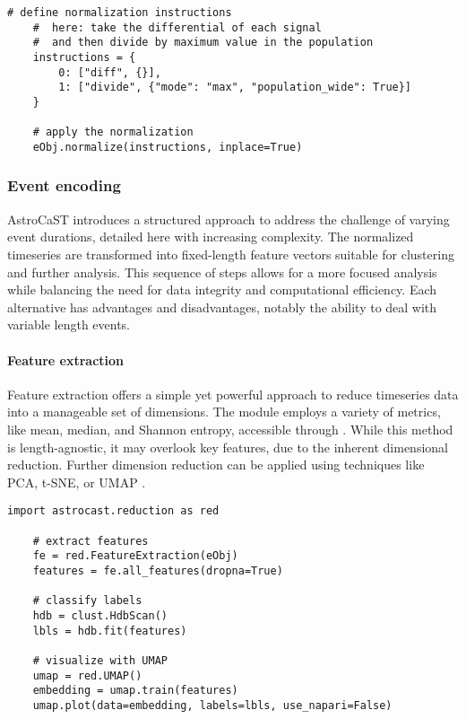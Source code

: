 \begin{lstlisting}[style=pyStyle]
    # define normalization instructions
    #  here: take the differential of each signal
    #  and then divide by maximum value in the population
    instructions = {
        0: ["diff", {}],
        1: ["divide", {"mode": "max", "population_wide": True}]
    }

    # apply the normalization
    eObj.normalize(instructions, inplace=True)
\end{lstlisting}

\subsubsection{Event encoding}

AstroCaST introduces a structured approach to address the challenge of varying event durations, detailed here with increasing complexity. The normalized timeseries are transformed into fixed-length feature vectors suitable for clustering and further analysis. This sequence of steps allows for a more focused analysis while balancing the need for data integrity and computational efficiency. Each alternative has advantages and disadvantages, notably the ability to deal with variable length events. 

\paragraph{Feature extraction}
Feature extraction offers a simple yet powerful approach to reduce timeseries data into a manageable set of dimensions. The module employs a variety of metrics, like mean, median, and Shannon entropy, accessible through . While this method is length-agnostic, it may overlook key features, due to the inherent dimensional reduction. Further dimension reduction can be applied using techniques like PCA, t-SNE, or UMAP .

\begin{lstlisting}[style=pyStyle]
    import astrocast.reduction as red

    # extract features
    fe = red.FeatureExtraction(eObj)
    features = fe.all_features(dropna=True)

    # classify labels
    hdb = clust.HdbScan()
    lbls = hdb.fit(features)

    # visualize with UMAP
    umap = red.UMAP()
    embedding = umap.train(features)
    umap.plot(data=embedding, labels=lbls, use_napari=False)
\end{lstlisting}

